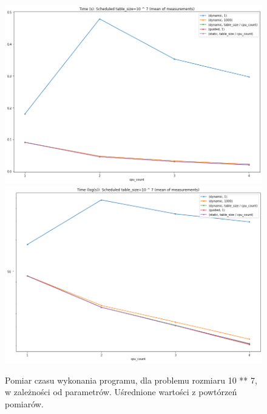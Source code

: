 \documentclass{article}
\begin{document}
        \begin{figure}[h!]
            \centering
            \includegraphics[width=17cm]{report2/images/TableSize/ex3_tb7_mean.png}
            \includegraphics[width=17cm]{report2/images/TableSize/ex3_tb7_mean_log.png}
            \caption{Pomiar czasu wykonania programu, dla problemu rozmiaru 10 ** 7, w zależności od parametrów. Uśrednione wartości z powtórzeń pomiarów. }
        \end{figure}
        \newpage
\end{document}
